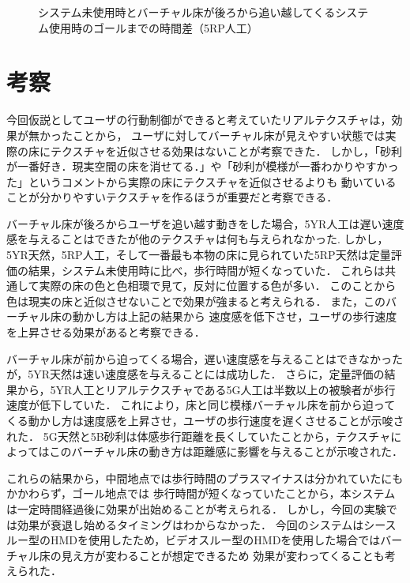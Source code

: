 \begin{figure}[H]
    \centering
    \caption{システム未使用時とバーチャル床が後ろから追い越してくるシステム使用時のゴールまでの時間差（5RP人工）}
    \label{fig:5RPjinko}
\end{figure}


\section{考察}
今回仮説としてユーザの行動制御ができると考えていたリアルテクスチャは，効果が無かったことから，
ユーザに対してバーチャル床が見えやすい状態では実際の床にテクスチャを近似させる効果はないことが考察できた．
しかし，「砂利が一番好き．現実空間の床を消せてる．」や「砂利が模様が一番わかりやすかった」というコメントから実際の床にテクスチャを近似させるよりも
動いていることが分かりやすいテクスチャを作るほうが重要だと考察できる．


バーチャル床が後ろからユーザを追い越す動きをした場合，5YR人工は遅い速度感を与えることはできたが他のテクスチャは何も与えられなかった.
しかし，5YR天然，5RP人工，そして一番最も本物の床に見られていた5RP天然は定量評価の結果，システム未使用時に比べ，歩行時間が短くなっていた．
これらは共通して実際の床の色と色相環で見て，反対に位置する色が多い．
このことから色は現実の床と近似させないことで効果が強まると考えられる．
また，このバーチャル床の動かし方は上記の結果から
速度感を低下させ，ユーザの歩行速度を上昇させる効果があると考察できる．


バーチャル床が前から迫ってくる場合，遅い速度感を与えることはできなかったが，5YR天然は速い速度感を与えることには成功した．
さらに，定量評価の結果から，5YR人工とリアルテクスチャである5G人工は半数以上の被験者が歩行速度が低下していた．
これにより，床と同じ模様バーチャル床を前から迫ってくる動かし方は速度感を上昇させ，ユーザの歩行速度を遅くさせることが示唆された．
5G天然と5B砂利は体感歩行距離を長くしていたことから，テクスチャによってはこのバーチャル床の動き方は距離感に影響を与えることが示唆された．


これらの結果から，中間地点では歩行時間のプラスマイナスは分かれていたにもかかわらず，ゴール地点では
歩行時間が短くなっていたことから，本システムは一定時間経過後に効果が出始めることが考えられる．
しかし，今回の実験では効果が衰退し始めるタイミングはわからなかった．
今回のシステムはシースルー型のHMDを使用したため，ビデオスルー型のHMDを使用した場合ではバーチャル床の見え方が変わることが想定できるため
効果が変わってくることも考えられた．
